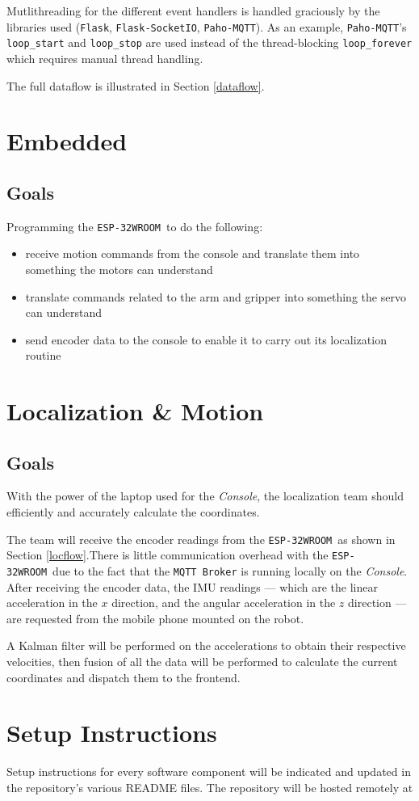 \documentclass[a4paper,12pt]{article}
\newcommand{\esp}{\texttt{ESP-32WROOM}}
\newcommand{\con}{\textit{Console}}
\begin{document}
Mutlithreading for the different event handlers is handled graciously by the libraries used (\texttt{Flask}, \texttt{Flask-SocketIO}, \texttt{Paho-MQTT}). As an example, \texttt{Paho-MQTT}'s \texttt{loop\_start} and \texttt{loop\_stop} are used instead of the thread-blocking \texttt{loop\_forever} which requires manual thread handling.

The full dataflow is illustrated in Section \ref{dataflow}.

\section{Embedded}
\subsection*{Goals}
Programming the \esp\ to do the following:
\begin{itemize}
    \item receive motion commands from the console and translate them into something the motors can understand
    \item translate commands related to the arm and gripper into something the servo can understand
    \item send encoder data to the console to enable it to carry out its localization routine
\end{itemize}
\section{Localization \& Motion}
\subsection*{Goals}

With the power of the laptop used for the \con, the localization team should efficiently and accurately calculate the coordinates.

The team will receive the encoder readings from the \esp\ as shown in Section \ref{locflow}.There is little communication overhead with the \esp\ due to the fact that the \texttt{MQTT Broker} is running locally on the \con.
After receiving the encoder data, the IMU readings --- which are the linear acceleration in the $x$ direction, and the angular acceleration in the $z$ direction --- are requested from the mobile phone mounted on the robot.

A Kalman filter will be performed on the accelerations to obtain their respective velocities, then fusion of all the data will be performed to calculate the current coordinates and dispatch them to the frontend.

\section{Setup Instructions}
Setup instructions for every software component will be indicated and updated in the repository's various README files.
The repository will be hosted remotely at 
\end{document}
